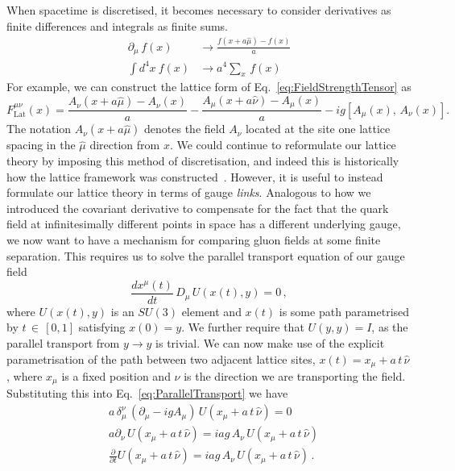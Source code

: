 When spacetime is discretised, it becomes necessary to consider derivatives as finite differences and integrals as finite sums.
\begin{align*}
\partial_\mu\,f(x)&\rightarrow \frac{f(x+a\hat{\mu})-f(x)}{a}\\
\int d^4x~f(x) &\rightarrow a^4\sum_x \,f(x)
\end{align*}
For example, we can construct the lattice form of Eq.~\ref{eq:FieldStrengthTensor} as
%
\begin{equation}
F_{\text{Lat}}^{\mu\nu}(x) = \frac{A_\nu(x+a\hat{\mu})-A_\nu(x)}{a}-\frac{A_\mu(x+a\hat{\nu})-A_\mu(x)}{a}-ig[A_\mu(x),\,A_\nu(x)].
\label{eq:DiscreteFST}
\end{equation}
%
The notation $A_\nu(x+a\hat{\mu})$ denotes the field $A_\nu$ located at the site one lattice spacing in the $\hat{\mu}$ direction from $x$. We could continue to reformulate our lattice theory by imposing this method of discretisation, and indeed this is historically how the lattice framework was constructed~\cite{Wilson:1974sk}. However, it is useful to instead formulate our lattice theory in terms of gauge {\it links}. Analogous to how we introduced the covariant derivative to compensate for the fact that the quark field at infinitesimally different points in space has a different underlying gauge, we now want to have a mechanism for comparing gluon fields at some finite separation. This requires us to solve the parallel transport equation of our gauge field~\cite{Bing:1999ee,peskin2018introduction}
%
\begin{equation}
\frac{dx^\mu(t)}{dt}\,D_\mu \,U(x(t),y)=0\, ,
\label{eq:ParallelTransport}
\end{equation}
%
where $U(x(t),y)$ is an $SU(3)$ element and $x(t)$ is some path parametrised by $t\,\in\,[0,1]$ satisfying $x(0)=y$. We further require that $U(y,y)=I$, as the parallel transport from $y\rightarrow y$ is trivial. We can now make use of the explicit parametrisation of the path between two adjacent lattice sites, $x(t) = x_\mu+a\,t\,\hat{\nu}$, where $x_\mu$ is a fixed position and $\nu$ is the direction we are transporting the field. Substituting this into Eq.~\ref{eq:ParallelTransport} we have
\begin{align*}
&a\,\delta^\nu_\mu\, (\partial_\mu-igA_\mu)\,U(x_\mu+a\,t\,\hat{\nu})=0\\
&a\partial_\nu\, U(x_\mu+a\,t\,\hat{\nu}) = iag\, A_\nu\,U(x_\mu+a\,t\,\hat{\nu})\\
&\frac{\partial}{\partial t}U(x_\mu+a\,t\,\hat{\nu}) = iag\,A_\nu\, U(x_\mu+a\,t\,\hat{\nu})\, .
\end{align*}
